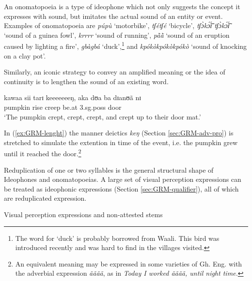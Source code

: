\begin{exe}
\begin{exe}
\begin{exe}
{\begin{exe}
\begin{exe}
\begin{exe}
\begin{exe}
\begin{exe}
\begin{exe}
\begin{exe}
\begin{xlist}
\begin{exe}
\begin{exe}
\begin{exe}
\begin{exe}
\begin{exe}
\begin{exe}
\begin{exe}
\begin{exe}
\begin{exe}
\begin{exe}
\begin{exe}
\begin{exe}
\begin{exe}
\begin{exe}
\begin{exe}
An onomatopoeia is a type of ideophone which not only suggests 
the concept   it expresses with sound, but imitates  the actual sound of an 
entity or event.  Examples of onomatopoeia are {\it púpù} 
`motorbike', {\it tʃétʃé} `bicycle', {\it tʃɔ̀kɔ̃́ɪ̃́ tʃɔ̀kɔ̃́ɪ̃́} `sound of a 
guinea fowl',  {\it krrrr} `sound of running',  {\it pã̀ã̀} `sound of an 
eruption caused by lighting a fire',  {\it gbàgbá}  `duck',\footnote{The 
word for `duck' is probably borrowed from Waali. This bird was introduced 
recently and was hard to find in the villages visited.}   and {\it 
kpókòkpókòkpókò} `sound of knocking on a clay pot'.


 Similarly, an iconic strategy to convey an amplified meaning or the idea of
continuity is to lengthen the sound of an existing word. 


 \ea\label{ex:GRM-lenght}
   \gll  kawaa sii tarɪ keeeeeeeŋ, aka dʊa  ba dɪanʊã nɪ\\
pumpkin rise {creep} {\dxm} {\conn} {be.at} {\sc 3.sg.poss} door {\postp}\\
\glt `The pumpkin crept, crept, crept, and crept up to their door mat.'
\z

In (\ref{ex:GRM-lenght}) the manner deictics {\it keŋ} (Section
\ref{sec:GRM-adv-pro}) is stretched to simulate the extention in time of the
event, i.e. the pumpkin grew until it reached the door.\footnote{An equivalent
meaning may be expressed in some varieties of Gh. Eng.  with the 
adverbial
expression  {\it ãããã}, as in {\it Today I worked ãããã, until night 
time.}}







Reduplication of one or two syllables is the general 
structural shape of
Ideophones and onomatopoeias. A large set of visual 
perception expressions can be treated as
 ideophonic expressions (Section \ref{sec:GRM-qualifier}), all of which are 
reduplicated expression.  

\ea\label{ex:BCTreduplic}{\rm Visual perception expressions  and 
non-attested stems}\\


\end{exe}
\end{exe}
\end{exe}
\end{exe}
\end{exe}
\end{exe}
\end{exe}
\end{exe}
\end{exe}
\end{exe}
\end{exe}
\end{exe}
\end{exe}
\end{exe}
\end{exe}
\end{xlist}
\end{exe}
\end{exe}
\end{exe}
\end{exe}
\end{exe}
\end{exe}
\end{exe}}
\end{exe}
\end{exe}
\end{exe}
